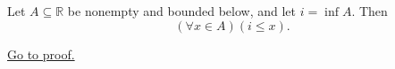 \begin{proposition}
\label{prop:every-element-lies-above-the-infimum}
Let $A\subseteq\mathbb{R}$ be nonempty and bounded below, and let
$i=\inf A$. Then
\[
  (\forall x\in A)(i\leq x).
\]

\hyperref[prf:every-element-lies-above-the-infimum]{Go to proof.}
\end{proposition}